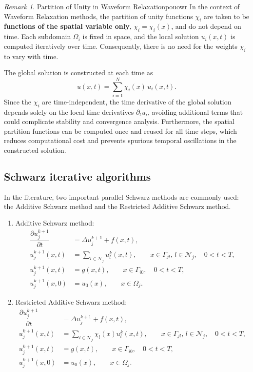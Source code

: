 \documentclass[a4paper, 11pt]{article}
\theoremstyle{remark}
\newtheorem{remark}[equation]{Remark}
\begin{document}
\begin{remark}{Partition of Unity in Waveform Relaxation}{pouowr}
In the context of Waveform Relaxation methods, the partition of unity functions $\chi_i$ are taken to be \textbf{functions of the spatial variable only}, $\chi_i = \chi_i(x)$, and do not depend on time. Each subdomain $\Omega_i$ is fixed in space, and the local solution $u_i(x,t)$ is computed iteratively over time. Consequently, there is no need for the weights $\chi_i$ to vary with time. 

\vspace{8pt}
\noindent The global solution is constructed at each time as
\begin{equation*}
    u(x,t) = \sum_{i=1}^{N} \chi_i(x)\, u_i(x,t).
\end{equation*}
Since the $\chi_i$ are time-independent, the time derivative of the global solution depends solely on the local time derivatives $\partial_t u_i$, avoiding additional terms that could complicate stability and convergence analysis. Furthermore, the spatial partition functions can be computed once and reused for all time steps, which reduces computational cost and prevents spurious temporal oscillations in the constructed solution.
\end{remark}

\subsection{Schwarz iterative algorithms}
In the literature, two important parallel Schwarz methods are commonly used: the Additive Schwarz method and the Restricted Additive Schwarz method.

\begin{enumerate}[label=(\arabic*)]
 \item Additive Schwarz method:
 \begin{align*}
    \dfrac{\partial u_{j}^{k+1}}{\partial t} &= \Delta u_{j}^{k+1} + f(x, t),\\
    u_{j}^{k+1}(x, t) &= \sum_{l\in\mathcal{N}_{j}}u_{l}^{k}(x, t), \qquad x\in \Gamma_{jl}, \,l\in \mathcal{N}_{j}, \quad 0<t<T,\\
    u_{j}^{k+1}(x, t) &= g(x, t), \qquad x\in \Gamma_{i0}, \quad 0<t<T,\\
    u_{j}^{k+1}(x, 0) &= u_{0}(x), \qquad x\in \Omega_{j}.
\end{align*}
\item Restricted Additive Schwarz method:
\begin{align*}
    \dfrac{\partial u_{j}^{k+1}}{\partial t} &= \Delta u_{j}^{k+1} + f(x, t),\\
    u_{j}^{k+1}(x, t) &= \sum_{l\in\mathcal{N}_{j}}\chi_{l}(x)u_{l}^{k}(x, t), \qquad x\in \Gamma_{jl}, \,l\in \mathcal{N}_{j}, \quad 0<t<T,\\
    u_{j}^{k+1}(x, t) &= g(x, t), \qquad x\in \Gamma_{i0}, \quad 0<t<T,\\
    u_{j}^{k+1}(x, 0) &= u_{0}(x), \qquad x\in \Omega_{j}.
\end{align*}
\end{enumerate}
\end{document}
